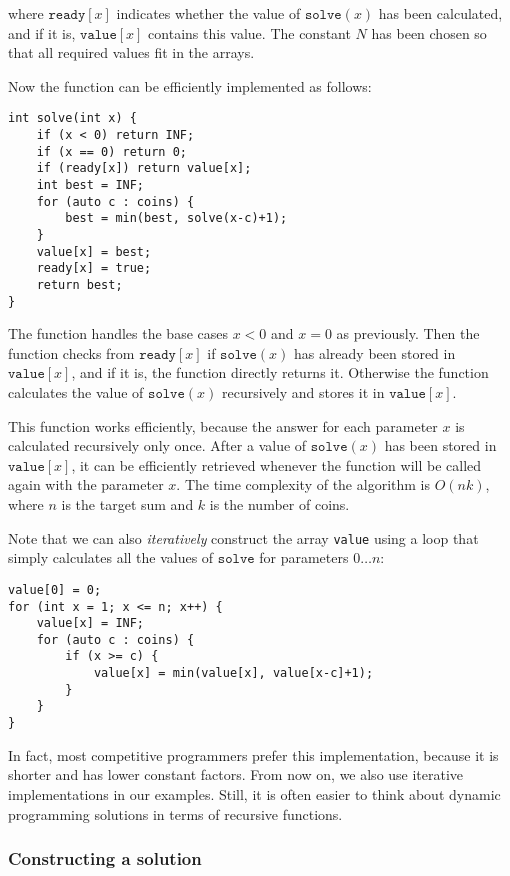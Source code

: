 where $\texttt{ready}[x]$ indicates
whether the value of $\texttt{solve}(x)$ has been calculated,
and if it is, $\texttt{value}[x]$
contains this value.
The constant $N$ has been chosen so
that all required values fit in the arrays.

Now the function can be efficiently
implemented as follows:

\begin{lstlisting}
int solve(int x) {
    if (x < 0) return INF;
    if (x == 0) return 0;
    if (ready[x]) return value[x];
    int best = INF;
    for (auto c : coins) {
        best = min(best, solve(x-c)+1);
    }
    value[x] = best;
    ready[x] = true;
    return best;
}
\end{lstlisting}

The function handles the base cases
$x<0$ and $x=0$ as previously.
Then the function checks from
$\texttt{ready}[x]$ if
$\texttt{solve}(x)$ has already been stored
in $\texttt{value}[x]$,
and if it is, the function directly returns it.
Otherwise the function calculates the value
of $\texttt{solve}(x)$
recursively and stores it in $\texttt{value}[x]$.

This function works efficiently,
because the answer for each parameter $x$
is calculated recursively only once.
After a value of $\texttt{solve}(x)$ has been stored in $\texttt{value}[x]$,
it can be efficiently retrieved whenever the
function will be called again with the parameter $x$.
The time complexity of the algorithm is $O(nk)$,
where $n$ is the target sum and $k$ is the number of coins.

Note that we can also \emph{iteratively}
construct the array \texttt{value} using
a loop that simply calculates all the values
of $\texttt{solve}$ for parameters $0 \ldots n$:
\begin{lstlisting}
value[0] = 0;
for (int x = 1; x <= n; x++) {
    value[x] = INF;
    for (auto c : coins) {
        if (x >= c) {
            value[x] = min(value[x], value[x-c]+1);
        }
    }
}
\end{lstlisting}

In fact, most competitive programmers prefer this
implementation, because it is shorter and has
lower constant factors.
From now on, we also use iterative implementations
in our examples.
Still, it is often easier to think about
dynamic programming solutions
in terms of recursive functions.


\subsubsection{Constructing a solution}


